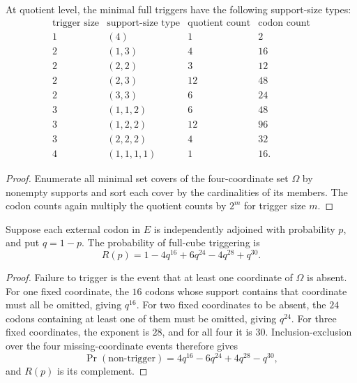 \begin{theorem}
\label{thm:philosophy-minimal-trigger-support-types}
At quotient level, the minimal full triggers have the following
support-size types:
$$
\begin{array}{c|l|r|r}
  \text{trigger size} & \text{support-size type} & \text{quotient count} & \text{codon count}\\
  \hline
  1 & (4) & 1 & 2\\
  \hline
  2 & (1,3) & 4 & 16\\
  2 & (2,2) & 3 & 12\\
  2 & (2,3) & 12 & 48\\
  2 & (3,3) & 6 & 24\\
  \hline
  3 & (1,1,2) & 6 & 48\\
  3 & (1,2,2) & 12 & 96\\
  3 & (2,2,2) & 4 & 32\\
  \hline
  4 & (1,1,1,1) & 1 & 16.
\end{array}
$$
\end{theorem}
\begin{proof}
Enumerate all minimal set covers of the four-coordinate set $\Omega$ by
nonempty supports and sort each cover by the cardinalities of its
members. The codon counts again multiply the quotient counts by
$2^{m}$ for trigger size $m$.
\end{proof}

\begin{theorem}
\label{thm:philosophy-bernoulli-reliability-polynomial}
Suppose each external codon in $E$ is independently adjoined with
probability $p$, and put $q=1-p$. The probability of full-cube
triggering is
$$
  R(p)
  =
  1-4q^{16}+6q^{24}-4q^{28}+q^{30}.
$$
\end{theorem}
\begin{proof}
Failure to trigger is the event that at least one coordinate of
$\Omega$ is absent. For one fixed coordinate, the $16$ codons whose
support contains that coordinate must all be omitted, giving
$q^{16}$. For two fixed coordinates to be absent, the $24$ codons
containing at least one of them must be omitted, giving $q^{24}$.
For three fixed coordinates, the exponent is $28$, and for all four it
is $30$. Inclusion-exclusion over the four missing-coordinate events
therefore gives
$$
  \Pr(\text{non-trigger})
  =
  4q^{16}-6q^{24}+4q^{28}-q^{30},
$$
and $R(p)$ is its complement.
\end{proof}

